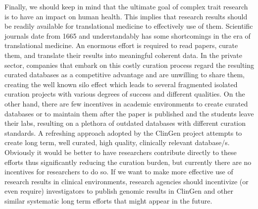 Finally, we should keep in mind that the ultimate goal of complex trait research is to have an impact on human health.
This implies that research results should be readily available for translational medicine to effectively use of them.
Scientific journals date from 1665 \cite{kronick1962history} and understandably has some shortcomings in the era of translational medicine.
An enormous effort is required to read papers, curate them, and translate their results into meaningful coherent data.
In the private sector, companies that embark on this costly curation process regard the resulting curated databases as a competitive advantage and are unwilling to share them, creating the well known silo effect which leads to several fragmented isolated curation projects with various degrees of success and different qualities.
On the other hand, there are few incentives in academic environments to create curated databases or to maintain them after the paper is published and the students leave their labs, resulting on a plethora of outdated databases with different curation standards.
A refreshing approach adopted by the ClinGen project attempts to create long term, well curated, high quality, clinically relevant database/s.
Obviously it would be better to have researchers contribute directly to these efforts thus significantly reducing the curation burden, but currently there are no incentives for researchers to do so.
If we want to make more effective use of research results in clinical environments, research agencies should incentivize (or even require) investigators to publish genomic results in ClinGen and other similar systematic long term efforts that might appear in the future.

